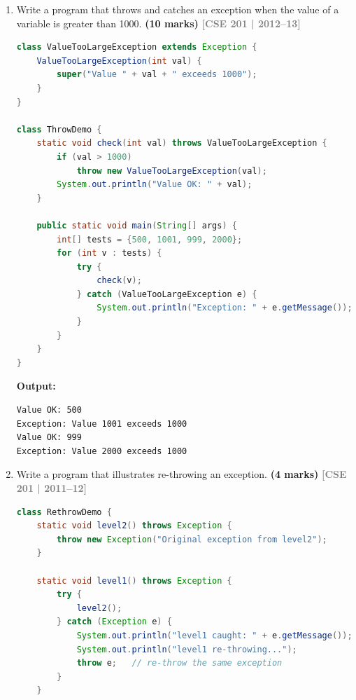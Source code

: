 \documentclass[12pt,a3paper]{article}
\newcommand{\yr}[1]{\hfill\textcolor{gray}{\small\textbf{[#1]}}}
\newcommand{\mk}[1]{\textcolor{orange!70!black}{\small\textbf{(#1 marks)}}}
\begin{document}
\begin{enumerate}
\item Write a program that throws and catches an exception when the value of a variable is greater than 1000. \mk{10}
\yr{CSE 201 | 2012--13}

\begin{tcolorbox}[enhanced,breakable,ansbox,
  colback=cE!4,colframe=cE,boxrule=0.8pt,arc=5pt,
  title={\textbf{Answer --- Throw and Catch When Value $>$ 1000}},
  fonttitle=\bfseries\color{white},colbacktitle=cE]
\begin{lstlisting}[language=Java]
class ValueTooLargeException extends Exception {
    ValueTooLargeException(int val) {
        super("Value " + val + " exceeds 1000");
    }
}

class ThrowDemo {
    static void check(int val) throws ValueTooLargeException {
        if (val > 1000)
            throw new ValueTooLargeException(val);
        System.out.println("Value OK: " + val);
    }

    public static void main(String[] args) {
        int[] tests = {500, 1001, 999, 2000};
        for (int v : tests) {
            try {
                check(v);
            } catch (ValueTooLargeException e) {
                System.out.println("Exception: " + e.getMessage());
            }
        }
    }
}
\end{lstlisting}
\textbf{Output:}
\begin{verbatim}
Value OK: 500
Exception: Value 1001 exceeds 1000
Value OK: 999
Exception: Value 2000 exceeds 1000
\end{verbatim}
\end{tcolorbox}



\item Write a program that illustrates re-throwing an exception. \mk{4}
\yr{CSE 201 | 2011--12}

\begin{tcolorbox}[enhanced,breakable,ansbox,
  colback=cE!4,colframe=cE,boxrule=0.8pt,arc=5pt,
  title={\textbf{Answer --- Re-throwing an Exception}},
  fonttitle=\bfseries\color{white},colbacktitle=cE]
\begin{lstlisting}[language=Java]
class RethrowDemo {
    static void level2() throws Exception {
        throw new Exception("Original exception from level2");
    }

    static void level1() throws Exception {
        try {
            level2();
        } catch (Exception e) {
            System.out.println("level1 caught: " + e.getMessage());
            System.out.println("level1 re-throwing...");
            throw e;   // re-throw the same exception
        }
    }


\end{lstlisting}
\end{tcolorbox}
\end{enumerate}
\end{document}

